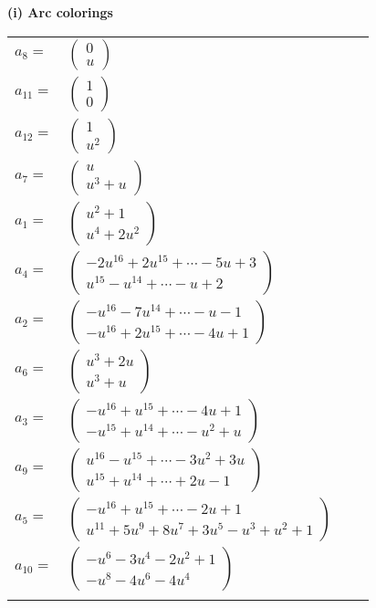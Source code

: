 \documentclass[1p]{elsarticle_modified}
\theoremstyle{definition}
\begin{document}
\flushleft \textbf{(i) Arc colorings}\\
\begin{tabular}{m{7pt} m{180pt} m{7pt} m{180pt} }
\flushright $a_{8}=$&$\begin{pmatrix}0\\u\end{pmatrix}$ \\
\flushright $a_{11}=$&$\begin{pmatrix}1\\0\end{pmatrix}$ \\
\flushright $a_{12}=$&$\begin{pmatrix}1\\u^2\end{pmatrix}$ \\
\flushright $a_{7}=$&$\begin{pmatrix}u\\u^3+u\end{pmatrix}$ \\
\flushright $a_{1}=$&$\begin{pmatrix}u^2+1\\u^4+2 u^2\end{pmatrix}$ \\
\flushright $a_{4}=$&$\begin{pmatrix}-2 u^{16}+2 u^{15}+\cdots-5 u+3\\u^{15}- u^{14}+\cdots- u+2\end{pmatrix}$ \\
\flushright $a_{2}=$&$\begin{pmatrix}- u^{16}-7 u^{14}+\cdots- u-1\\- u^{16}+2 u^{15}+\cdots-4 u+1\end{pmatrix}$ \\
\flushright $a_{6}=$&$\begin{pmatrix}u^3+2 u\\u^3+u\end{pmatrix}$ \\
\flushright $a_{3}=$&$\begin{pmatrix}- u^{16}+u^{15}+\cdots-4 u+1\\- u^{15}+u^{14}+\cdots- u^2+u\end{pmatrix}$ \\
\flushright $a_{9}=$&$\begin{pmatrix}u^{16}- u^{15}+\cdots-3 u^2+3 u\\u^{15}+u^{14}+\cdots+2 u-1\end{pmatrix}$ \\
\flushright $a_{5}=$&$\begin{pmatrix}- u^{16}+u^{15}+\cdots-2 u+1\\u^{11}+5 u^9+8 u^7+3 u^5- u^3+u^2+1\end{pmatrix}$ \\
\flushright $a_{10}=$&$\begin{pmatrix}- u^6-3 u^4-2 u^2+1\\- u^8-4 u^6-4 u^4\end{pmatrix}$\\&\end{tabular}
\end{document}
